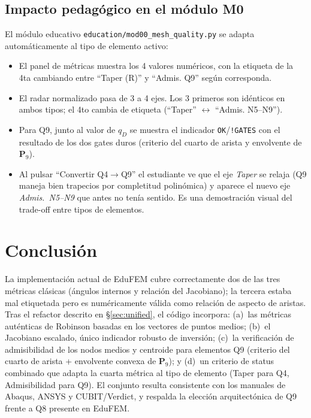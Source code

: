 \documentclass[11pt,a4paper]{article}
\begin{document}
\subsection{Impacto pedag\'ogico en el m\'odulo M0}
El m\'odulo educativo \texttt{education/mod00\_mesh\_quality.py} se adapta autom\'aticamente al tipo de elemento activo:
\begin{itemize}[leftmargin=1.4em,itemsep=1pt]
  \item El panel de m\'etricas muestra los 4 valores num\'ericos, con la etiqueta de la 4ta cambiando entre ``Taper (R)'' y ``Admis. Q9'' seg\'un corresponda.
  \item El radar normalizado pasa de 3 a 4 ejes. Los 3 primeros son id\'enticos en ambos tipos; el 4to cambia de etiqueta (``Taper'' $\leftrightarrow$ ``Admis. N5--N9'').
  \item Para Q9, junto al valor de $q_D$ se muestra el indicador \texttt{OK}/\texttt{!GATES} con el resultado de los dos gates duros (criterio del cuarto de arista y envolvente de $\mathbf{P}_9$).
  \item Al pulsar ``Convertir Q4$\to$Q9'' el estudiante ve que el eje \emph{Taper} se relaja (Q9 maneja bien trapecios por completitud polin\'omica) y aparece el nuevo eje \emph{Admis.~N5--N9} que antes no ten\'ia sentido. Es una demostraci\'on visual del trade-off entre tipos de elementos.
\end{itemize}

\section{Conclusi\'on}
La implementaci\'on actual de EduFEM cubre correctamente dos de las tres m\'etricas cl\'asicas (\'angulos internos y relaci\'on del Jacobiano); la tercera estaba mal etiquetada pero es num\'ericamente v\'alida como relaci\'on de aspecto de aristas. Tras el refactor descrito en \S\ref{sec:unified}, el c\'odigo incorpora: (a)~las m\'etricas aut\'enticas de Robinson basadas en los vectores de puntos medios; (b)~el Jacobiano escalado, \'unico indicador robusto de inversi\'on; (c)~la verificaci\'on de admisibilidad de los nodos medios y centroide para elementos Q9 (criterio del cuarto de arista + envolvente convexa de $\mathbf{P}_9$); y (d)~un criterio de status combinado que adapta la cuarta m\'etrica al tipo de elemento (Taper para Q4, Admisibilidad para Q9). El conjunto resulta consistente con los manuales de Abaqus, ANSYS y CUBIT/Verdict, y respalda la elecci\'on arquitect\'onica de Q9 frente a Q8 presente en EduFEM.
\end{document}
